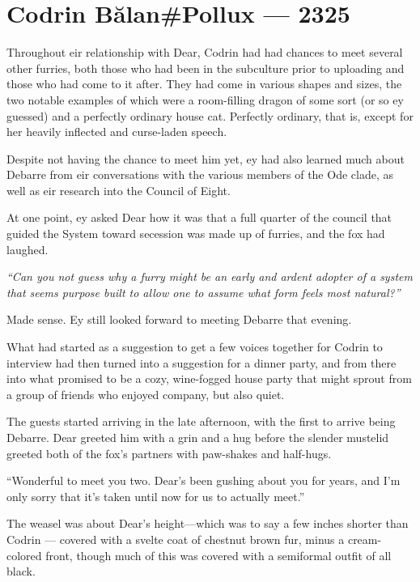 \hypertarget{codrin-bux103lanpollux-2325}{%
\chapter{Codrin Bălan\#Pollux — 2325}\label{codrin-bux103lanpollux-2325}}

Throughout eir relationship with Dear, Codrin had had chances to meet several other furries, both those who had been in the subculture prior to uploading and those who had come to it after. They had come in various shapes and sizes, the two notable examples of which were a room-filling dragon of some sort (or so ey guessed) and a perfectly ordinary house cat. Perfectly ordinary, that is, except for her heavily inflected and curse-laden speech.

Despite not having the chance to meet him yet, ey had also learned much about Debarre from eir conversations with the various members of the Ode clade, as well as eir research into the Council of Eight.

At one point, ey asked Dear how it was that a full quarter of the council that guided the System toward secession was made up of furries, and the fox had laughed.

\emph{``Can you not guess why a furry might be an early and ardent adopter of a system that seems purpose built to allow one to assume what form feels most natural?''}

Made sense. Ey still looked forward to meeting Debarre that evening.

What had started as a suggestion to get a few voices together for Codrin to interview had then turned into a suggestion for a dinner party, and from there into what promised to be a cozy, wine-fogged house party that might sprout from a group of friends who enjoyed company, but also quiet.

The guests started arriving in the late afternoon, with the first to arrive being Debarre. Dear greeted him with a grin and a hug before the slender mustelid greeted both of the fox's partners with paw-shakes and half-hugs.

``Wonderful to meet you two. Dear's been gushing about you for years, and I'm only sorry that it's taken until now for us to actually meet.''

The weasel was about Dear's height---which was to say a few inches shorter than Codrin — covered with a svelte coat of chestnut brown fur, minus a cream-colored front, though much of this was covered with a semiformal outfit of all black.

